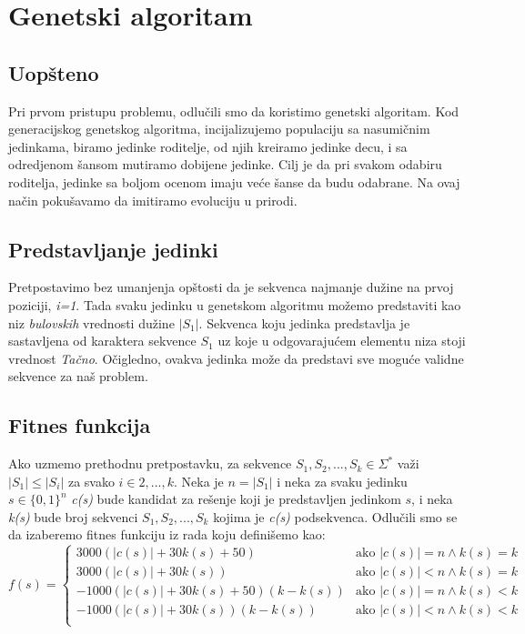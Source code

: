 \documentclass{article}
\begin{document}
    \pagebreak


    \section{Genetski algoritam}

    \subsection{Uopšteno}
    Pri prvom pristupu problemu, odlučili smo da koristimo genetski algoritam. Kod generacijskog genetskog algoritma, incijalizujemo populaciju sa nasumičnim jedinkama, biramo jedinke roditelje, od njih kreiramo jedinke decu, i sa odredjenom šansom mutiramo dobijene jedinke. Cilj je da pri svakom odabiru roditelja, jedinke sa boljom ocenom imaju veće šanse da budu odabrane. Na ovaj način pokušavamo da imitiramo evoluciju u prirodi.

    \subsection{Predstavljanje jedinki}
    Pretpostavimo bez umanjenja opštosti da je sekvenca najmanje dužine na prvoj poziciji, \emph{i=1}. Tada svaku jedinku u genetskom algoritmu možemo predstaviti kao niz \emph{bulovskih} vrednosti dužine $|S_1|$. Sekvenca koju jedinka predstavlja je sastavljena od karaktera sekvence \emph{$S_1$} uz koje u odgovarajućem elementu niza stoji vrednost \emph{Tačno}. Očigledno, ovakva jedinka može da predstavi sve moguće validne sekvence za naš problem.

    \subsection{Fitnes funkcija}
    Ako uzmemo prethodnu pretpostavku, za sekvence $S_1, S_2,..., S_k \in \Sigma^*$ važi $|S_1| \leq |S_i|$ za svako $i \in {2,...,k}$. Neka je $n = |S_1|$ i neka za svaku jedinku $s \in \{0,1\}^n$ \emph{c(s)} bude kandidat za rešenje koji je predstavljen jedinkom $s$, i neka \emph{k(s)} bude broj sekvenci $S_1, S_2,..., S_k$ kojima je \emph{c(s)} podsekvenca.
    Odlučili smo se da izaberemo fitnes funkciju iz rada \cite{ft} koju definišemo kao:
    $$ f(s) =
    \begin{cases}
        3000(|c(s)| + 30k(s) + 50) & \text{ako } |c(s)| = n \land k(s) = k \\
        3000(|c(s)| + 30k(s)) & \text{ako } |c(s)| < n \land k(s) = k \\
        -1000(|c(s)| + 30k(s) + 50)(k - k(s)) & \text{ako } |c(s)| = n \land k(s) < k \\
        -1000(|c(s)| + 30k(s))(k - k(s)) & \text{ako } |c(s)| < n \land k(s) < k \\
    \end{cases}
    $$
\end{document}
